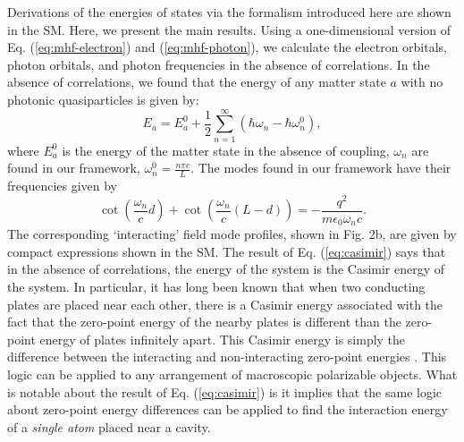 \documentclass[aps,prl,twocolumn,
	groupedaddress,superscriptaddress,
	amsfonts,amssymb,amsmath,floatfix,
	citeautoscript]{revtex4-1}
\begin{document}
Derivations of the energies of states via the formalism introduced here are shown in the SM. Here, we present the main results. Using a one-dimensional version of Eq. (\ref{eq:mhf-electron}) and (\ref{eq:mhf-photon}), we calculate the electron orbitals, photon orbitals, and photon frequencies in the absence of correlations. In the absence of correlations, we found that the energy of any matter state $a$ with no photonic quasiparticles is given by:
\begin{equation}
E_{a} = E^{0}_a + \frac{1}{2}\sum\limits_{n=1}^{\infty}(\hbar\omega_n - \hbar\omega_n^0),
\label{eq:casimir}
\end{equation}
where $E_a^0$ is the energy of the matter state in the absence of coupling, $\omega_n$ are found in our framework, $\omega_n^0 = \frac{n\pi c}{L}$.  The modes found in our framework have their frequencies given by
\begin{equation}
\cot\left(\frac{\omega_n}{c}d \right)+\cot\left(\frac{\omega_n}{c}(L-d) \right) = -\frac{q^2}{m\epsilon_0\omega_nc}.
\label{eq:cot}
\end{equation}
The corresponding `interacting' field mode profiles, shown in Fig. 2b, are given by compact expressions shown in the SM.
The result of Eq. (\ref{eq:casimir})  says that in the absence of correlations, the energy of the system is the Casimir energy of the system. In particular, it has long been known that when two conducting plates are placed near each other, there is a Casimir energy associated with the fact that the zero-point energy of the nearby plates is different than the zero-point energy of plates infinitely apart. This Casimir energy is simply the difference between the interacting and non-interacting zero-point energies \cite{casimir1948attraction,lifshitz1956theory}. This logic can be applied to any arrangement of macroscopic polarizable objects. What is notable about the result of Eq. (\ref{eq:casimir}) is it implies that the same logic about zero-point energy differences can be applied to find the interaction energy  of a \textit{single atom} placed near a cavity. 
\end{document}
